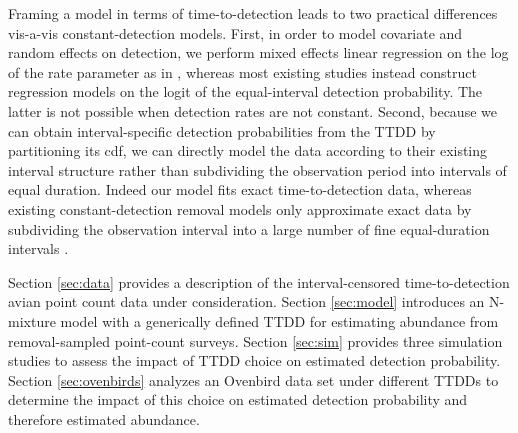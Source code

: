 \documentclass[12pt]{article}
\begin{document}
Framing a model in terms of time-to-detection leads to two practical differences vis-a-vis constant-detection models.  
First, in order to model covariate and random effects on detection, we perform mixed effects linear regression on the log of the rate parameter as in \citet{Solymos2013}, whereas most existing studies instead construct regression models on the logit of the equal-interval detection probability.  
The latter is not possible when detection rates are not constant.  
Second, because we can obtain interval-specific detection probabilities from the TTDD by partitioning its cdf, we can directly model the data according to their existing interval structure rather than subdividing the observation period into intervals of equal duration.  
Indeed our model fits exact time-to-detection data, whereas existing constant-detection removal models only approximate exact data by subdividing the observation interval into a large number of fine equal-duration intervals \citep{Reidy2011, Amundson2014}.



Section \ref{sec:data} provides a description of the interval-censored time-to-detection avian point count data under consideration.
Section \ref{sec:model} introduces an N-mixture model with a generically defined TTDD for estimating abundance from removal-sampled point-count surveys.
Section \ref{sec:sim} provides three simulation studies to assess the impact of TTDD choice on estimated detection probability. 
Section \ref{sec:ovenbirds} analyzes an Ovenbird data set under different TTDDs to determine the impact of this choice on estimated detection probability and therefore estimated abundance.
\end{document}

